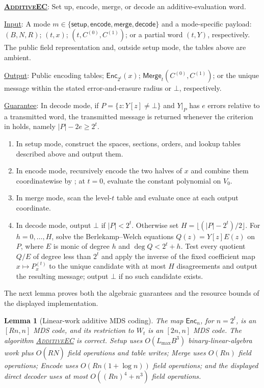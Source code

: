 \documentclass[11pt]{article}
\newenvironment{fminipage}%
  {\begin{Sbox}\begin{minipage}}%
  {\end{minipage}\end{Sbox}\fbox{\TheSbox}}
\newenvironment{algbox}[0]{%
\vskip 0.2in
\noindent
\begin{fminipage}{6.3in}
}{%
\end{fminipage}
\vskip 0.2in
}
\newtheorem{lemma}{Lemma}[section]
\begin{document}
\begin{algbox}
\textbf{\uline{\textsc{AdditiveEC}}}: Set up, encode, merge, or decode an
additive-evaluation word.
\label{alg:additive}

\uline{Input}: A mode
$m\in\{\mathsf{setup},\mathsf{encode},\mathsf{merge},\mathsf{decode}\}$ and a
mode-specific payload: $(B,N,R)$; $(t,x)$; $(t,C^{(0)},C^{(1)})$; or a partial
word $(t,Y)$, respectively.  The public field representation and, outside
setup mode, the tables above are ambient.

\uline{Output}: Public encoding tables; $\mathsf{Enc}_{2^t}(x)$;
$\mathsf{Merge}_t(C^{(0)},C^{(1)})$; or the unique message within the stated
error-and-erasure radius or $\bot$, respectively.

\uline{Guarantee}: In decode mode, if $P=\{z:Y[z]\ne\bot\}$ and $Y|_P$ has
$e$ errors relative to a transmitted word, the transmitted message is returned
whenever the criterion in  holds, namely
$|P|-2e\ge2^t$.

\begin{enumerate}[leftmargin=*,label=\arabic*.]
 \item In setup mode, construct the spaces, sections, orders, and lookup tables
 described above and output them.
 \item In encode mode, recursively encode the two halves of $x$ and combine
 them coordinatewise by ; at $t=0$, evaluate the constant
 polynomial on $V_0$.
 \item In merge mode, scan the level-$t$ table and evaluate 
 once at each output coordinate.
 \item In decode mode, output $\bot$ if $|P|<2^t$.  Otherwise set
 $H=\lfloor(|P|-2^t)/2\rfloor$.  For $h=0,\ldots,H$, solve the
 Berlekamp--Welch equations
 $Q(z)=Y[z]E(z)$ on $P$, where $E$ is monic of degree $h$ and
 $\deg Q<2^t+h$.  Test every quotient $Q/E$ of degree less than $2^t$ and
 apply the inverse of the fixed coefficient map $x\mapsto P_x^{(t)}$ to the
 unique candidate with at most $H$ disagreements and output the resulting
 message; output $\bot$ if no such candidate exists.
\end{enumerate}
\end{algbox}

The next lemma proves both the algebraic guarantees and the resource bounds of
the displayed implementation.

\begin{lemma}[Linear-work additive MDS coding]
\label{lem:additive-code}
The map $\mathsf{Enc}_n$, for $n=2^t$, is an $[Rn,n]$ MDS code, and its
restriction to $W_t$ is an $[2n,n]$ MDS code.  The algorithm
\hyperref[alg:additive]{\textsc{AdditiveEC}} is correct.  Setup uses
$O(L_{\max}B^3)$ binary-linear-algebra work plus $O(R\widehat N)$ field
operations and table writes; Merge uses $O(Rn)$ field operations; Encode uses
$O(Rn(1+\log n))$ field operations; and the displayed direct decoder uses at
most $O((Rn)^4+n^3)$ field operations.
\end{lemma}
\end{document}
